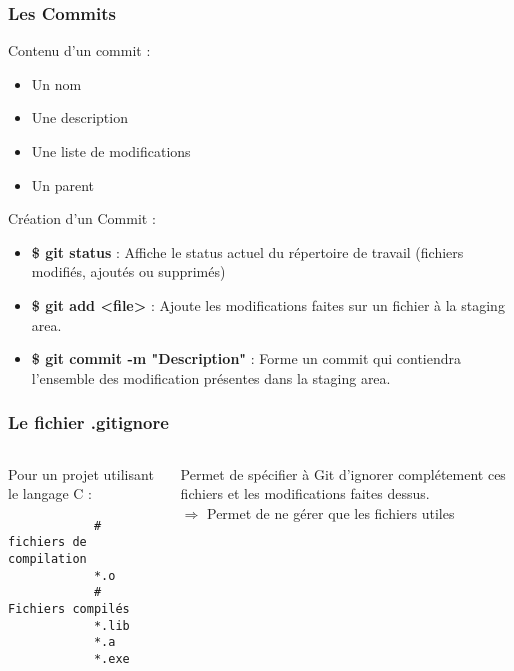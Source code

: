\documentclass{beamer}
\begin{document}
\begin{frame}
	\frametitle{Les Commits}
	Contenu d'un commit : 
	\begin{itemize}
		\item Un nom
		\item Une description
		\item Une liste de modifications
		\item Un parent
	\end{itemize}
	Création d'un Commit :
	\begin{itemize}
		\item {\bfseries \$ git status }: Affiche le status actuel du répertoire de travail (fichiers modifiés, ajoutés ou supprimés)
		\item {\bfseries \$ git add <file> }: Ajoute les modifications faites sur un fichier à la staging area. \\
		\item {\bfseries \$ git commit -m "Description"} : Forme un commit qui contiendra l'ensemble des modification présentes dans la staging area.
	\end{itemize}
\end{frame}
\begin{frame}[fragile]
	\frametitle{Le fichier .gitignore}
	\begin{columns}[c]
		\begin{column}{5cm}
			Pour un projet utilisant le langage C : \\
			\begin{verbatim}
			# fichiers de compilation
			*.o
			# Fichiers compilés
			*.lib
			*.a
			*.exe
			\end{verbatim}
		\end{column}
		\begin{column}{5cm}
			Permet de spécifier à Git d'ignorer complétement ces fichiers et les modifications faites dessus. \\
			$\Rightarrow$ Permet de ne gérer que les fichiers utiles
		\end{column}
	\end{columns}
\end{frame}
\end{document}
